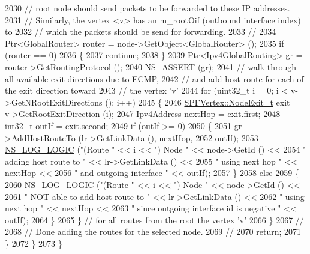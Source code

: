 \begin{DoxyCode}
2030 \textcolor{comment}{// root node should send packets to be forwarded to these IP addresses.}
2031 \textcolor{comment}{// Similarly, the vertex <v> has an m\_rootOif (outbound interface index) to}
2032 \textcolor{comment}{// which the packets should be send for forwarding.}
2033 \textcolor{comment}{//}
2034               Ptr<GlobalRouter> router = node->GetObject<GlobalRouter> ();
2035               \textcolor{keywordflow}{if} (router == 0)
2036                 \{
2037                   \textcolor{keywordflow}{continue};
2038                 \}
2039               Ptr<Ipv4GlobalRouting> gr = router->GetRoutingProtocol ();
2040               \hyperlink{assert_8h_a6dccdb0de9b252f60088ce281c49d052}{NS\_ASSERT} (gr);
2041               \textcolor{comment}{// walk through all available exit directions due to ECMP,}
2042               \textcolor{comment}{// and add host route for each of the exit direction toward}
2043               \textcolor{comment}{// the vertex 'v'}
2044               \textcolor{keywordflow}{for} (uint32\_t i = 0; i < v->GetNRootExitDirections (); i++)
2045                 \{
2046                   \hyperlink{classns3_1_1SPFVertex_a0adf6255ec0357050ef5436597b4cb32}{SPFVertex::NodeExit\_t} exit = v->GetRootExitDirection (i);
2047                   Ipv4Address nextHop = exit.first;
2048                   int32\_t outIf = exit.second;
2049                   \textcolor{keywordflow}{if} (outIf >= 0)
2050                     \{
2051                       gr->AddHostRouteTo (lr->GetLinkData (), nextHop,
2052                                           outIf);
2053                       \hyperlink{group__logging_ga88acd260151caf2db9c0fc84997f45ce}{NS\_LOG\_LOGIC} (\textcolor{stringliteral}{"(Route "} << i << \textcolor{stringliteral}{") Node "} << node->GetId () <<
2054                                     \textcolor{stringliteral}{" adding host route to "} << lr->GetLinkData () <<
2055                                     \textcolor{stringliteral}{" using next hop "} << nextHop <<
2056                                     \textcolor{stringliteral}{" and outgoing interface "} << outIf);
2057                     \}
2058                   \textcolor{keywordflow}{else}
2059                     \{
2060                       \hyperlink{group__logging_ga88acd260151caf2db9c0fc84997f45ce}{NS\_LOG\_LOGIC} (\textcolor{stringliteral}{"(Route "} << i << \textcolor{stringliteral}{") Node "} << node->GetId () <<
2061                                     \textcolor{stringliteral}{" NOT able to add host route to "} << lr->GetLinkData () <<
2062                                     \textcolor{stringliteral}{" using next hop "} << nextHop <<
2063                                     \textcolor{stringliteral}{" since outgoing interface id is negative "} << outIf);
2064                     \}
2065                 \} \textcolor{comment}{// for all routes from the root the vertex 'v'}
2066             \}
2067 \textcolor{comment}{//}
2068 \textcolor{comment}{// Done adding the routes for the selected node.}
2069 \textcolor{comment}{//}
2070           \textcolor{keywordflow}{return};
2071         \}
2072     \}
2073 \}
\end{DoxyCode}


